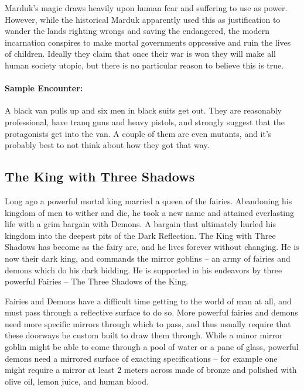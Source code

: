 Marduk's magic draws heavily upon human fear and suffering to use as power. However, while the historical Marduk apparently used this as justification to wander the lands righting wrongs and saving the endangered, the modern incarnation conspires to make mortal governments oppressive and ruin the lives of children. Ideally they claim that once their war is won they will make all human society utopic, but there is no particular reason to believe this is true.

\paragraph{Sample Encounter:} A black van pulls up and six men in black suits get out. They are reasonably professional, have tranq guns and heavy pistols, and strongly suggest that the protagonists get into the van. A couple of them are even mutants, and it's probably best to not think about how they got that way.

\subsection{The King with Three Shadows} 

Long ago a powerful mortal king married a queen of the fairies. Abandoning his kingdom of men to wither and die, he took a new name and attained everlasting life with a grim bargain with Demons. A bargain that ultimately hurled his kingdom into the deepest pits of the Dark Reflection. The King with Three Shadows has become as the fairy are, and he lives forever without changing. He is now their dark king, and commands the mirror goblins -- an army of fairies and demons which do his dark bidding. He is supported in his endeavors by three powerful Fairies -- The Three Shadows of the King.

Fairies and Demons have a difficult time getting to the world of man at all, and must pass through a reflective surface to do so. More powerful fairies and demons need more specific mirrors through which to pass, and thus usually require that these doorways be custom built to draw them through. While a minor mirror goblin might be able to come through a pool of water or a pane of glass, powerful demons need a mirrored surface of exacting specifications -- for example one might require a mirror at least 2 meters across made of bronze and polished with olive oil, lemon juice, and human blood.

